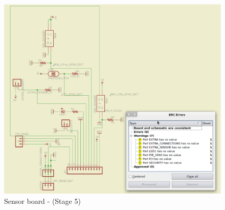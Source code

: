 \documentclass[12pt,a4paper]{report}
\begin{document}
\begin{figure}[H]
\centering
\includegraphics*[scale=0.25]{sens_brd_s5}
\caption{Sensor board -  (Stage 5)}
\label{Sensor-brd-s5}
\end{figure}
\ \\
%
\end{document}
